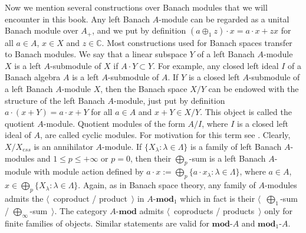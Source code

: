 Now we mention several constructions over Banach modules that we will encounter
in this book.  Any left Banach $A$-module can be regarded as a unital Banach
module over $A_+$, and we put by definition $(a\oplus_1 z)\cdot x=a\cdot x+zx$
for all $a\in A$, $x\in X$ and $z\in\mathbb{C}$. Most constructions used for
Banach spaces transfer to Banach modules.  We say that a linear subspace $ Y$ of
a left Banach $A$-module $X$ is a left $A$-submodule of $X$ 
if $A\cdot Y\subset Y$. For example, any closed left ideal $I$ of a 
Banach algebra $A$ is a left $A$-submodule of $A$. If $Y$ is a closed left
$A$-submodule of a left Banach $A$-module $X$, then the Banach space $X/Y$ can
be endowed with the structure of the left Banach $A$-module, just put by
definition $a\cdot(x+Y)=a\cdot x+Y$ for all $a\in A$ and $x+Y\in X/Y$. This
object is called the quotient $A$-module. Quotient modules of the form $A/I$,
where $I$ is a closed left ideal of $A$, are called cyclic modules. For motivation for
this term see \cite[proposition 6.2.2]{HelBanLocConvAlg}. Clearly, $X/X_{ess}$
is an annihilator $A$-module. If $ \{X_\lambda:\lambda\in\Lambda \}$ is a family of left Banach
$A$-modules and $1\leq p\leq +\infty$ or $p=0$, then their $\bigoplus_p$-sum is
a left Banach $A$-module with module action defined 
by $a\cdot x:=\bigoplus_p \{a\cdot x_\lambda:\lambda\in\Lambda \}$, 
where $a\in A$, $x\in\bigoplus_p \{X_\lambda:\lambda\in\Lambda \}$. 
Again, as in Banach space theory, any family
of $A$-modules admits the $\langle$~coproduct / product~$\rangle$ in
$A\text{-}\mathbf{mod}_1$ which in fact is their $\langle$~$\bigoplus_1$-sum /
$\bigoplus_\infty$-sum~$\rangle$. The category $A\text{-}\mathbf{mod}$ admits
$\langle$~coproducts / products~$\rangle$ only for finite families of objects.
Similar statements are valid for $\mathbf{mod}\text{-}A$ and $\mathbf{mod}_1\text{-}A$.


